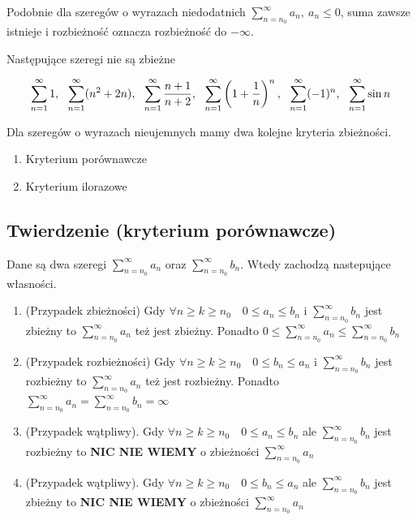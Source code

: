 Podobnie dla szeregów o wyrazach niedodatnich $ \sum\limits_{n = n_0}^{\infty} a_n, \ a_n \leq 0 $, suma zawsze istnieje
i rozbieżność oznacza rozbieżność do $-\infty$. \\

\begin{przyklad}
Następujące szeregi nie są zbieżne

$$ \suminfty{1} 1, \ \ \suminfty{1} (n^2 + 2n), \ \
\suminfty{1} \frac{n+1}{n+2}, \ \ \suminfty{1} \left(1 + \frac{1}{n} \right)^n , \ \ 
\suminfty{1} (-1)^n , \ \ \suminfty{1} \sin n$$
\end{przyklad}

Dla szeregów o wyrazach nieujemnych mamy dwa kolejne kryteria zbieżności.

\begin{enumerate}
    \item Kryterium porównawcze
    \item Kryterium ilorazowe \\
\end{enumerate} 

\subsection*{Twierdzenie (kryterium porównawcze)}

Dane są dwa szeregi $ \sum\limits_{n = n_0}^{\infty} a_n $ oraz $ \sum\limits_{n = n_0}^{\infty} b_n $. Wtedy zachodzą nastepujące
własności.

\begin{enumerate}
    \item (Przypadek zbieżności) Gdy $ \forall n \geq k \geq n_0 \quad 0 \leq a_n \leq b_n $ i $ \sum\limits_{n = n_0}^{\infty} b_n $
    jest zbieżny to $ \sum\limits_{n = n_0}^{\infty} a_n $ też jest zbieżny. Ponadto
    $ 0 \leq \sum\limits_{n = n_0}^{\infty} a_n \leq \sum\limits_{n = n_0}^{\infty} b_n $
    
    \item (Przypadek rozbieżności) Gdy $ \forall n \geq k \geq n_0 \quad 0 \leq b_n \leq a_n $ i $ \sum\limits_{n = n_0}^{\infty} b_n $
    jest rozbieżny to $ \sum\limits_{n = n_0}^{\infty} a_n $ też jest rozbieżny. Ponadto
    $ \sum\limits_{n = n_0}^{\infty} a_n = \sum\limits_{n = n_0}^{\infty} b_n = \infty $

    \item (Przypadek wątpliwy). Gdy $ \forall n \geq k \geq n_0 \quad 0 \leq a_n \leq b_n $ ale $ \sum\limits_{n = n_0}^{\infty} b_n $ jest
    rozbieżny to \textbf{NIC NIE WIEMY} o zbieżności $ \sum\limits_{n = n_0}^{\infty} a_n $

    \item (Przypadek wątpliwy). Gdy $ \forall n \geq k \geq n_0 \quad 0 \leq b_n \leq a_n $ ale $ \sum\limits_{n = n_0}^{\infty} b_n $ jest
    zbieżny to \textbf{NIC NIE WIEMY} o zbieżności $ \sum\limits_{n = n_0}^{\infty} a_n $ \\
\end{enumerate}

